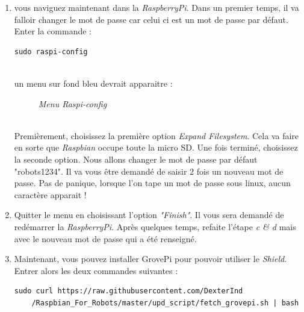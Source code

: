 \begin{enumerate}
\begin{enumerate}
	\item vous naviguez maintenant dans la \textit{RaspberryPi}. Dans un premier temps, il va falloir changer le mot de passe car celui ci est un mot de passe par défaut. Enter la commande :\\
	\begin{lstlisting}[style=MyBashStyle]
	sudo raspi-config
	\end{lstlisting}\\
	un menu sur fond bleu devrait apparaitre :\\
	
\begin{figure}[H]
\begin{center}
\end{center}
	\caption{ \textit{Menu Raspi-config}}
\end{figure}\\

Premièrement, choisissez la première option \textit{Expand Filesystem}. Cela va faire en sorte que \textit{Raspbian} occupe toute la micro SD. Une fois terminé, choisissez la seconde option. Nous allons changer le mot de passe par défaut "robots1234". Il va vous être demandé de saisir 2 fois un nouveau mot de passe. Pas de panique, lorsque l'on tape un mot de passe sous linux, aucun caractère apparait !
	
	\item Quitter le menu en choisissant l'option \textit{"Finish"}. Il vous sera demandé de redémarrer la \textit{RaspberryPi}. Après quelques temps, refaite l'étape \textit{c & d} mais avec le nouveau mot de passe qui a été renseigné.
	\item Maintenant, vous pouvez installer GrovePi pour pouvoir utiliser le \textit{Shield}. Entrer alors les deux commandes suivantes :\\
	\begin{lstlisting}[style=MyBashStyle]
	sudo curl https://raw.githubusercontent.com/DexterInd
	/Raspbian_For_Robots/master/upd_script/fetch_grovepi.sh | bash
	 

\end{lstlisting}
\end{enumerate}
\end{enumerate}
